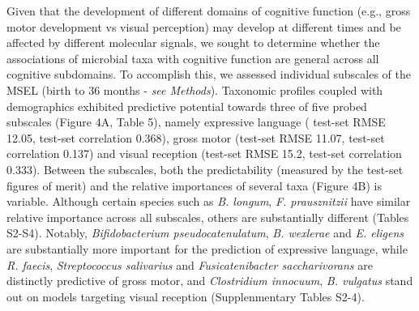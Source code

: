 \documentclass{article}
\begin{document}
Given that the development of different domains of cognitive function
(e.g., gross motor development vs visual perception) may develop at different times
and be affected by different molecular signals,
we sought to determine whether the associations of microbial taxa
with cognitive function are general across all cognitive subdomains.
To accomplish this, we assessed individual subscales of the  
MSEL (birth to 36 months - \textit{see Methods}). 
Taxonomic profiles coupled with demographics exhibited predictive potential towards three
of five probed subscales (Figure 4A, Table 5), 
namely expressive language ( test-set RMSE 12.05, test-set correlation 0.368), 
gross motor (test-set RMSE 11.07, test-set correlation 0.137) and 
visual reception (test-set RMSE 15.2, test-set correlation 0.333).
Between the subscales, both the predictability (measured by the test-set figures of merit)
and the relative importances of several taxa (Figure 4B) is variable.
Although certain species such as \textit{B. longum}, \textit{F. prausznitzii} 
have similar relative importance across all subscales, others are substantially different (Tables S2-S4).
Notably, \textit{Bifidobacterium pseudocatenulatum}, \textit{B. wexlerae} and \textit{E. eligens} are
substantially more important for the prediction of expressive language, while
\textit{R. faecis}, \textit{Streptococcus salivarius} and \textit{Fusicatenibacter saccharivorans} are
distinctly predictive of gross motor, and
\textit{Clostridium innocuum}, \textit{B. vulgatus} 
stand out on models targeting visual reception (Supplenmentary Tables S2-4).
\end{document}
